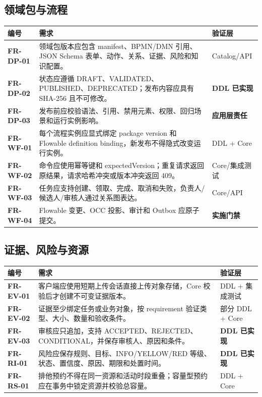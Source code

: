 \documentclass[journal,a4paper,onecolumn]{IEEEtran}
\newcommand{\req}[1]{\textbf{#1}}
\newcommand{\statusimpl}{\textbf{DDL 已实现}}
\newcommand{\statusapp}{\textbf{应用层责任}}
\newcommand{\statusgate}{\textbf{实施门禁}}
\begin{document}
\subsection{领域包与流程}
\begin{longtable}{p{}p{}p{}}
\toprule
编号 & 需求 & 验证层 \\
\midrule
\endhead
\req{FR-DP-01} & 领域包版本应包含 manifest、BPMN/DMN 引用、JSON Schema 表单、动作、关系、证据、风险和知识配置。 & Catalog/API\\
\req{FR-DP-02} & 状态应遵循 DRAFT、VALIDATED、PUBLISHED、DEPRECATED；发布内容应具有 SHA-256 且不可修改。 & \statusimpl\\
\req{FR-DP-03} & 发布前应校验语法、引用、禁用元素、权限、回归场景和运行实例影响。 & \statusapp\\
\req{FR-WF-01} & 每个流程实例应显式绑定 package version 和 Flowable definition binding，新发布不得隐式改变运行实例。 & DDL + Core\\
\req{FR-WF-02} & 命令应使用幂等键和 expectedVersion；重复请求返回原结果，请求哈希冲突或版本冲突返回 409。 & Core/集成测试\\
\req{FR-WF-03} & 任务应支持创建、领取、完成、取消和失败，负责人/候选人/审核人通过关系图表达。 & Core/API\\
\req{FR-WF-04} & Flowable 变更、OCC 投影、审计和 Outbox 应原子提交。 & \statusgate\\
\bottomrule
\end{longtable}

\subsection{证据、风险与资源}
\begin{longtable}{p{}p{}p{}}
\toprule
编号 & 需求 & 验证层 \\
\midrule
\endhead
\req{FR-EV-01} & 客户端应使用短期上传会话直接上传对象存储，Core 校验后才创建不可变证据版本。 & DDL + 集成测试\\
\req{FR-EV-02} & 证据至少绑定任务或业务对象，按 requirement 验证类型、大小、数量和验收条件。 & 部分 DDL + Core\\
\req{FR-EV-03} & 审核应只追加，支持 ACCEPTED、REJECTED、CONDITIONAL，并保存审核人、原因和条件。 & \statusimpl\\
\req{FR-RI-01} & 风险应保存规则、目标、INFO/YELLOW/RED 等级、状态、置信度、原因、期限和处置时间。 & \statusimpl\\
\req{FR-RS-01} & 排他预约不得在同一资源和活动时段重叠；容量型预约应在事务中锁定资源并校验总容量。 & DDL + Core\\
\bottomrule
\end{longtable}
\end{document}

